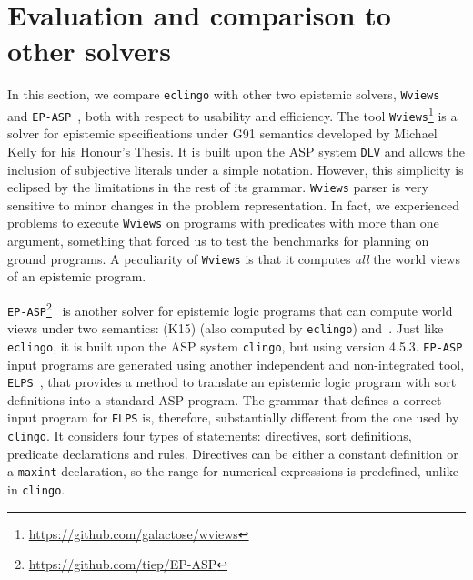\documentclass{new_tlp}
\def\eclingo{{\tt eclingo}}
\def\wviews{{\tt Wviews}}
\def\clingo{{\tt clingo}}
\def\wviews{{\tt Wviews}}
\def\EPASP{{\tt EP-ASP}}
\begin{document}
\section{Evaluation and comparison to other solvers}
\label{sec:eval}

In this section,
we compare \eclingo{} with other two epistemic solvers, \wviews~\cite{Kelly07} and \EPASP~\cite{SLKL17}, both with respect to usability and efficiency.
%
The tool \wviews\footnote{\url{https://github.com/galactose/wviews}} is a solver for epistemic specifications under G91 semantics developed by Michael Kelly for his Honour's Thesis. It is built upon the ASP system {\tt DLV} and allows the inclusion of subjective literals under a  simple notation. However, this simplicity is eclipsed by the limitations in the rest of its grammar. \wviews{} parser is very sensitive to minor changes in the problem representation. In fact, we experienced problems to execute \wviews{} on programs with predicates with more than one argument, something that forced us to test the benchmarks for planning on ground programs.
A peculiarity of \wviews{} is that it computes \emph{all} the world views of an epistemic program.

\EPASP\footnote{\url{https://github.com/tiep/EP-ASP}}~\cite{SLKL17} is another solver for epistemic logic programs that can compute world views under two semantics: \cite{kawabagezh15} (K15)  (also computed by \eclingo{}) and~\cite{sheeit17a}. Just like \eclingo{}, it is built upon the ASP system \clingo, but using version 4.5.3. \EPASP{} input programs are generated using another independent and non-integrated tool, {\tt ELPS}~\cite{BK14}, that provides a method to translate an epistemic logic program with sort definitions into a standard ASP program. The grammar that defines a correct input program for {\tt ELPS} is, therefore, substantially different from the one used by \clingo{}. It considers four types of statements: directives, sort definitions, predicate declarations and rules. Directives can be either a constant definition or a {\tt maxint} declaration, so the range for numerical expressions is predefined, unlike in \clingo{}.
\end{document}
